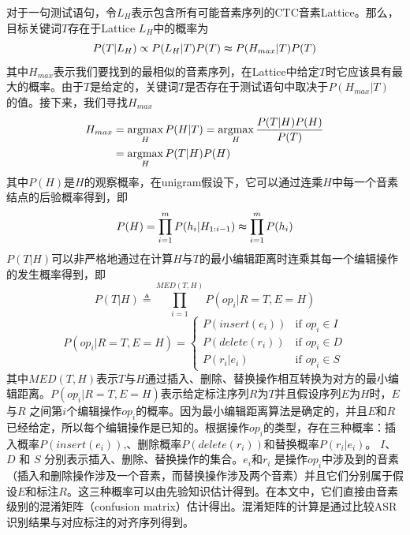 对于一句测试语句，令$L_{H}$表示包含所有可能音素序列的CTC音素Lattice。那么，目标关键词$T$存在于Lattice $L_{H}$中的概率为
\begin{equation}
P(T|L_{H}) \propto P(L_{H}|T)P(T) \thickapprox P(H_{max}|T)P(T)
\end{equation}
其中$H_{max}$表示我们要找到的最相似的音素序列，在Lattice中给定$T$时它应该具有最大的概率。由于$T$是给定的，关键词$T$是否存在于测试语句中取决于$P(H_{max}|T)$ 的值。接下来，我们寻找$H_{max}$
\begin{equation}
\label{equ:hlatt}
\begin{split}
H_{max} &= \mathop{\operatorname*{argmax}}_{H}{P(H|T)}=\mathop{\operatorname*{argmax}}_{H}{\frac{P(T|H)P(H)}{P(T)}} \\ &= \mathop{\operatorname*{argmax}}_{H}{P(T|H)P(H)}
\end{split}
\end{equation}
其中$P(H)$是$H$的观察概率，在unigram假设下，它可以通过连乘$H$中每一个音素结点的后验概率得到，即
\begin{equation}
\label{equ:ph}
P(H) = \mathop{\prod}_{i=1}^{m}{P(h_{i}|H_{1:i-1})} \thickapprox \mathop{\prod}_{i=1}^{m}{P(h_{i})}
\end{equation}
$P(T|H)$可以非严格地通过在计算$H$与$T$的最小编辑距离时连乘其每一个编辑操作的发生概率得到，即
\begin{equation}
\label{equ:pth}
P(T|H) \triangleq \mathop{\prod}_{i=1}^{MED(T,H)}{P(op_{i}|R=T,E=H)}
\end{equation}
\begin{equation}
P(op_{i}|R=T,E=H) = \begin{cases}
  P(insert(e_{i})) & \text{if } op_{i} \in I \\
  P(delete(r_{i})) & \text{if } op_{i} \in D \\
  P(r_{i}|e_{i}) & \text{if } op_{i} \in S
\end{cases}
\end{equation}
其中$MED(T,H)$表示$T$与$H$通过插入、删除、替换操作相互转换为对方的最小编辑距离。$P(op_{i}|R=T,E=H)$表示给定标注序列$R$为$T$并且假设序列$E$为$H$时，$E$与$R$ 之间第$i$个编辑操作$op_{i}$的概率。因为最小编辑距离算法是确定的，并且$E$和$R$已经给定，所以每个编辑操作是已知的。根据操作$op_{i}$的类型，存在三种概率：插入概率$P(insert(e_{i}))$,、删除概率$P(delete(r_{i}))$和替换概率$P(r_{i}|e_{i})$。 $I$、 $D$ 和 $S$ 分别表示插入、删除、替换操作的集合。$e_{i}$和$r_{i}$ 是操作$op_{i}$中涉及到的音素（插入和删除操作涉及一个音素，而替换操作涉及两个音素）并且它们分别属于假设$E$和标注$R$。这三种概率可以由先验知识估计得到。在本文中，它们直接由音素级别的混淆矩阵（confusion matrix）估计得出。混淆矩阵的计算是通过比较ASR识别结果与对应标注的对齐序列得到。
